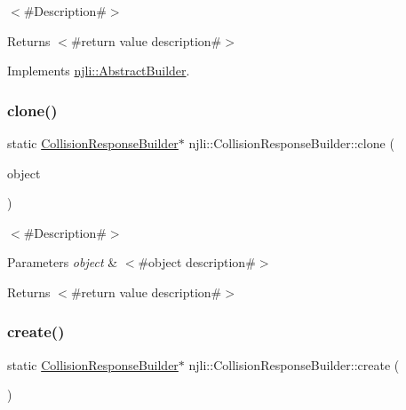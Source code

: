 $<$\#\+Description\#$>$

\begin{DoxyReturn}{Returns}
$<$\#return value description\#$>$ 
\end{DoxyReturn}


Implements \mbox{\hyperlink{classnjli_1_1_abstract_builder_aa1d220053e182c37b31b427499c6eacf}{njli\+::\+Abstract\+Builder}}.

\mbox{\label{classnjli_1_1_collision_response_builder_a7fdea96fbff8d82972b5ca78a0bb6741}} 
\subsubsection{\texorpdfstring{clone()}{clone()}}
{\footnotesize\ttfamily static \mbox{\hyperlink{classnjli_1_1_collision_response_builder}{Collision\+Response\+Builder}}$\ast$ njli\+::\+Collision\+Response\+Builder\+::clone (\begin{DoxyParamCaption}\item[{const \mbox{\hyperlink{classnjli_1_1_collision_response_builder}{Collision\+Response\+Builder}} \&}]{object }\end{DoxyParamCaption})\hspace{0.3cm}{\ttfamily [static]}}

$<$\#\+Description\#$>$


\begin{DoxyParams}{Parameters}
{\em object} & $<$\#object description\#$>$\\
\hline
\end{DoxyParams}
\begin{DoxyReturn}{Returns}
$<$\#return value description\#$>$ 
\end{DoxyReturn}
\mbox{\label{classnjli_1_1_collision_response_builder_ac962560ad9fab5686416c4033a059d71}} 
\subsubsection{\texorpdfstring{create()}{create()}}
{\footnotesize\ttfamily static \mbox{\hyperlink{classnjli_1_1_collision_response_builder}{Collision\+Response\+Builder}}$\ast$ njli\+::\+Collision\+Response\+Builder\+::create (\begin{DoxyParamCaption}{ }\end{DoxyParamCaption})\hspace{0.3cm}{\ttfamily [static]}}


